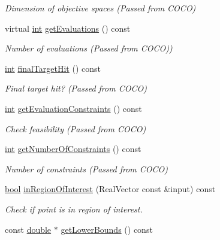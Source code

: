 \begin{DoxyCompactItemize}
\begin{DoxyCompactList}\small\item\em Dimension of objective spaces (Passed from C\+O\+CO) \end{DoxyCompactList}\item 
virtual \hyperlink{classint}{int} \hyperlink{classCOCOfunc_ac8770bd1d86e5c945b68a79998725d3b}{get\+Evaluations} () const\hypertarget{classCOCOfunc_ac8770bd1d86e5c945b68a79998725d3b}{}\label{classCOCOfunc_ac8770bd1d86e5c945b68a79998725d3b}

\begin{DoxyCompactList}\small\item\em Number of evaluations (Passed from C\+O\+CO)) \end{DoxyCompactList}\item 
\hyperlink{classint}{int} \hyperlink{classCOCOfunc_a0cd816c1e89961720d2aa66e69b19634}{final\+Target\+Hit} () const\hypertarget{classCOCOfunc_a0cd816c1e89961720d2aa66e69b19634}{}\label{classCOCOfunc_a0cd816c1e89961720d2aa66e69b19634}

\begin{DoxyCompactList}\small\item\em Final target hit? (Passed from C\+O\+CO) \end{DoxyCompactList}\item 
\hyperlink{classint}{int} \hyperlink{classCOCOfunc_a9b419be16b230e408030c5e57218a52d}{get\+Evaluation\+Constraints} () const\hypertarget{classCOCOfunc_a9b419be16b230e408030c5e57218a52d}{}\label{classCOCOfunc_a9b419be16b230e408030c5e57218a52d}

\begin{DoxyCompactList}\small\item\em Check feasibility (Passed from C\+O\+CO) \end{DoxyCompactList}\item 
\hyperlink{classint}{int} \hyperlink{classCOCOfunc_ab7a3f2bc6dcf4cc749af04043e74badc}{get\+Number\+Of\+Constraints} () const\hypertarget{classCOCOfunc_ab7a3f2bc6dcf4cc749af04043e74badc}{}\label{classCOCOfunc_ab7a3f2bc6dcf4cc749af04043e74badc}

\begin{DoxyCompactList}\small\item\em Number of constraints (Passed from C\+O\+CO) \end{DoxyCompactList}\item 
\hyperlink{classbool}{bool} \hyperlink{classCOCOfunc_ad6aa968a96ec542ff3696de2e982ea5d}{in\+Region\+Of\+Interest} (Real\+Vector const \&input) const
\begin{DoxyCompactList}\small\item\em Check if point is in region of interest. \end{DoxyCompactList}\item 
const \hyperlink{classdouble}{double} $\ast$ \hyperlink{classCOCOfunc_a36c4660ffc4626348b94c0ddd6e79391}{get\+Lower\+Bounds} () const\hypertarget{classCOCOfunc_a36c4660ffc4626348b94c0ddd6e79391}{}\label{classCOCOfunc_a36c4660ffc4626348b94c0ddd6e79391}


\end{DoxyCompactItemize}
